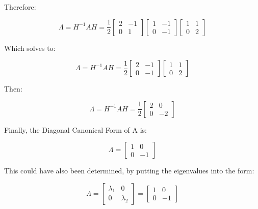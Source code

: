 \documentclass[12pt, letterpaper]{../assignment}
\begin{document}
Therefore:


$$ \Lambda = H^{-1} A H = \frac{1}{2} \left[\begin{array}{ccc} 2 & -1 \\ 0 & 1 \end{array}\right]
\left[\begin{array}{ccc} 1 & -1 \\ 0 & -1 \end{array}\right]
\left[\begin{array}{ccc} 1 & 1 \\ 0 & 2 \end{array}\right]$$

Which solves to:

$$ \Lambda = H^{-1} A H = \frac{1}{2}
\left[\begin{array}{ccc} 2 & -1 \\ 0 & -1 \end{array}\right]
\left[\begin{array}{ccc} 1 & 1 \\ 0 & 2 \end{array}\right]$$

Then:

$$ \Lambda = H^{-1} A H = \frac{1}{2}
\left[\begin{array}{ccc} 2 & 0 \\ 0 & -2 \end{array}\right]
$$

Finally, the Diagonal Canonical Form of A is:

\begin{answer}
    $$ \Lambda  = \left[\begin{array}{ccc} 1 & 0 \\ 0 & -1 \end{array}\right] $$
\end{answer}

This could have also been determined, by putting the eigenvalues into the form:

\begin{answer}
    $$ \Lambda  = \left[\begin{array}{ccc} \lambda_1 & 0 \\ 0 & \lambda_2 \end{array}\right]
    = \left[\begin{array}{ccc} 1 & 0 \\ 0 & -1 \end{array}\right] $$
\end{answer}
\end{document}
